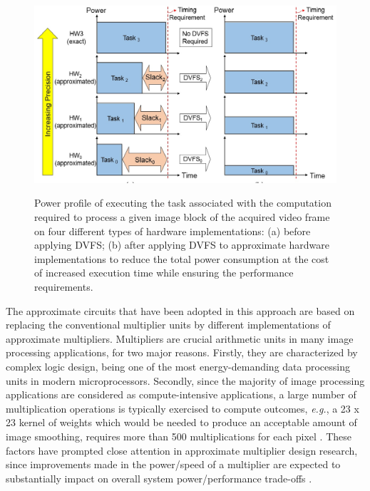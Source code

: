 \documentclass[journal]{IEEEtran}
\begin{document}
\begin{figure}[!t]
\centering
   \caption{Power profile of executing the task associated with the computation required to process a given image block of the acquired video frame on four different types of hardware implementations: (a) before applying DVFS; (b) after applying DVFS to approximate hardware implementations to reduce the total power consumption at the cost of increased execution time while ensuring the performance requirements.}
    \includegraphics[width=\columnwidth]{powerprofile.jpg}
\label{Pp}
\end{figure}

 The approximate circuits that have been adopted in this approach are based on replacing the conventional multiplier units by different implementations of approximate multipliers. Multipliers are crucial arithmetic units in many image processing applications, for two major reasons. Firstly, they are characterized by complex logic design, being one of the most energy-demanding data processing units in modern microprocessors. Secondly, since the majority of image processing applications are considered as compute-intensive applications, a large number of multiplication operations is typically exercised to compute outcomes, \emph{e.g.}, a 23 x 23 kernel of weights which would be needed to produce an acceptable amount of image smoothing, requires more than 500 multiplications for each pixel \cite{Russ2008ImProc}. These factors have prompted close attention in approximate multiplier design research, since improvements made in the power/speed of a multiplier are expected to substantially impact on overall system power/performance trade-offs \cite{Jiang2016}.\\
 
\end{document}
